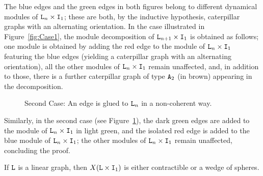 \documentclass{amsart}
\begin{document}
The blue edges and the green edges in both figures belong to different dynamical modules of ${\tt L}_n\times {\tt I}_1$; these are both, by the inductive hypothesis, caterpillar graphs with an alternating orientation. In the case illustrated in Figure~\ref{fig:Case1}, the module decomposition of ${\tt L}_{n+1}\times {\tt I}_1$ is obtained as follows;  one module is obtained by  adding the red edge to the module of ${\tt L}_n\times {\tt I}_1$ featuring the blue edges (yielding a caterpillar graph with an alternating orientation), all the other modules of ${\tt L}_n\times {\tt I}_1$ remain unaffected, and, in addition to those, there is a further caterpillar graph of type ${\tt A}_{2}$ (in brown) appearing in the decomposition.  \begin{figure}[H]
    \centering
{}   
			\caption{Second Case: An edge is glued to ${\tt L}_n$ in a non-coherent way. }
    \label{fig:Case2}
\end{figure}
Similarly, in the second case (see Figure~\ref{fig:Case2}), the dark green edges are added to the module of ${\tt L}_n\times {\tt I}_1$ in light green, and the isolated red edge is added to the blue module of ${\tt L}_n\times {\tt I}_1$; the other modules  of ${\tt L}_n\times {\tt I}_1$ remain unaffected,  concluding the proof. %
 \endproof
\begin{cor}
If ${\tt L}$ is a linear graph, then $X({\tt L}\times {\tt I}_1)$ is either contractible or a wedge of spheres.
\end{cor}
\end{document}
